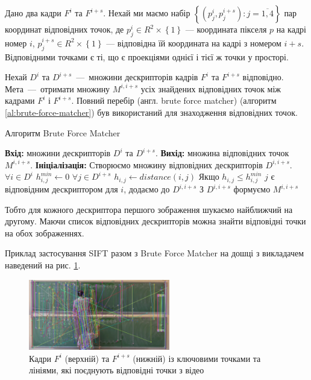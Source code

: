 Дано два кадри \(F^{i}\) та \(F^{i + s}\). Нехай ми маємо набір
\(\left\{ \left( p_{j}^{i},p_{j}^{i + s} \right):j = \overline{1,4} \right\}\)
пар координат відповідних точок, де
\(p_{j}^{i} \in R^{2} \times \left\{ 1 \right\}\) --- координата пікселя
\(p\) на кадрі номер \(i\),
\(p_{j}^{i + s} \in R^{2} \times \left\{ 1 \right\}\) --- відповідна їй
координата на кадрі з номером \(i + s\). Відповідними точками є ті, що є
проекціями однієї і тієї ж точки у просторі.

Нехай $D^i$ та $D^{i+s}$~---~множини дескрипторів кадрів \(F^{i}\) та \(F^{i + s}\)
відповідно. Мета~---~отримати множину \(M^{i,i+s}\) усіх знайдених відповідних точок  між кадрами
\(F^{i}\) і \(F^{i + s}\).
Повний перебір (англ. brute force matcher) (алгоритм \ref{al:brute-force-matcher})
був використаний для знаходження відповідних точок.

\begin{algorithm}[H]
    \caption{Алгоритм Brute Force Matcher}
    \label{al:brute-force-matcher}
    \begin{algorithmic}
        \State \textbf{Вхід:} множини дескрипторів $D^i$ та $D^{i+s}$.
        \State \textbf{Вихід:} множина відповідних точок \(M^{i,i+s}\).
        \State \textbf{Ініціалізація:} Створюємо множину відповідних дескрипторів $D^{i,i+s}$.
        \State $\forall i \in D^i$
        \State  \qquad $h^{min}_{i,j} \gets 0$
        \State  \qquad  $\forall j \in D^{i+s}$
        \State  \qquad \qquad  $h_{i,j} \gets distance(i,j)$
        \State  \qquad \qquad  Якщо {$h_{i,j} \leq h^{min}_{i,j}$}
        \State  \qquad \qquad  \qquad $j$ є відповідним  дескриптором для $i$, додаємо до  $D^{i,i+s}$
        \State З $D^{i,i+s}$ формуємо \(M^{i,i+s}\)
    \end{algorithmic}
\end{algorithm}

Тобто для кожного дескриптора першого зображення шукаємо найближчий на другому.
Маючи список відповідних дескрипторів можна знайти відповідні точки на обох зображеннях.

Приклад застосування SIFT разом з Brute Force Matcher на
дошці з викладачем наведений на рис. \ref{fig:matches_img}.

\begin{figure}[H]
    \centering
    \includegraphics[width=0.55\textwidth]{images/matches_img}
    \caption{Кадри $F^i$ (верхній) та $F^{i+s}$ (нижній) із ключовими точками та лініями,
        які поєднують відповідні точки з відео \cite{video:mmzi:yakovlev_discrete_math}
        \label{fig:matches_img}
    }
\end{figure}

